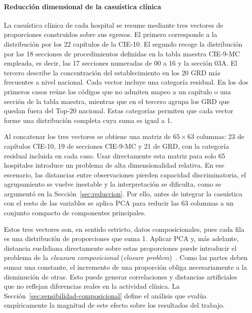 \paragraph{Reducción dimensional de la casuística clínica}
\label{sec:pca}

La casuística clínica de cada hospital se resume mediante tres vectores de
proporciones construidos sobre sus egresos. El primero corresponde a la
distribución por los 22 capítulos de la CIE-10. El segundo recoge la
distribución por las 18 secciones de procedimientos definidas en la tabla
maestra CIE-9-MC empleada, es decir, las 17 secciones numeradas de 00 a 16 y la
sección 03A. El tercero describe la concentración del establecimiento en los
20 GRD más frecuentes a nivel nacional. Cada vector incluye una categoría
residual. En los dos primeros casos reúne los códigos que no admiten mapeo a un
capítulo o una sección de la tabla maestra, mientras que en el tercero agrupa los GRD que
quedan fuera del Top-20 nacional. Estas categorías permiten que cada vector
forme una distribución completa cuya suma es igual a 1.

Al concatenar los tres vectores se obtiene una matriz de $65 \times 63$
columnas: 23 de capítulos CIE-10, 19 de secciones CIE-9-MC y 21 de GRD, con la
categoría residual incluida en cada caso. Usar directamente esta matriz para
solo 65 hospitales introduce un problema de alta dimensionalidad relativa. En
ese escenario, las distancias entre observaciones pierden capacidad
discriminatoria, el agrupamiento se vuelve inestable y la interpretación se
dificulta, como se argumentó en la Sección~\ref{sec:reduccion}. Por ello, antes
de integrar la casuística con el resto de las variables se aplica PCA para
reducir las 63 columnas a un conjunto compacto de componentes principales.

Estos tres vectores son, en sentido estricto, datos composicionales, pues cada
fila es una distribución de proporciones que suma 1. Aplicar PCA y, más
adelante, distancia euclidiana directamente sobre estas proporciones puede
introducir el problema de la \emph{clausura composicional} (\textit{closure
problem})~\citep{Aitchison1982}. Como las partes deben sumar una constante, el incremento de una
proporción obliga necesariamente a la disminución de otras. Esto puede generar
correlaciones y distancias artificiales que no reflejan diferencias reales en la
actividad clínica. La Sección~\ref{sec:sensibilidad-composicional} define el
análisis que evalúa empíricamente la magnitud de este efecto sobre los
resultados del trabajo.

